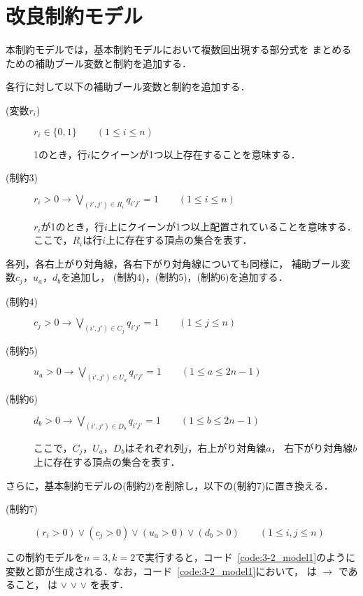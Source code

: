 \section{改良制約モデル}
本制約モデルでは，基本制約モデルにおいて複数回出現する部分式を
まとめるための補助ブール変数と制約を追加する．

各行に対して以下の補助ブール変数と制約を追加する．
\begin{description}
 \item[(変数$r_i$)] $r_{i} \in \{0,1\} \qquad (1 \leq i \leq n)$\par
  1のとき，行$i$にクイーンが1つ以上存在することを意味する．
 \item[(制約3)] $r_{i}>0 \rightarrow \bigvee\limits_{(i',j')\in R_{i}} q_{i'j'}=1 \qquad (1 \leq i \leq n)$ \par
  $r_{i}$が1のとき，行$i$上にクイーンが1つ以上配置されていることを意味する．
  ここで，$R_i$は行$i$上に存在する頂点の集合を表す．
\end{description}
%
各列，各右上がり対角線，各右下がり対角線についても同様に，
補助ブール変数$c_{j}$，$u_{a}$，$d_{b}$を追加し，
(制約4)，(制約5)，(制約6)を追加する．
%
\begin{description}
 \item[(制約4)] $c_{j}>0 \rightarrow \bigvee\limits_{(i',j')\in C_{j}} q_{i'j'}=1 \qquad (1 \leq j \leq n)$ 
 \item[(制約5)] $u_{a}>0 \rightarrow \bigvee\limits_{(i',j')\in U_{a}} q_{i'j'}=1 \qquad (1 \leq a \leq 2n-1)$ 
 \item[(制約6)] $d_{b}>0 \rightarrow \bigvee\limits_{(i',j')\in D_{b}} q_{i'j'}=1 \qquad (1 \leq b \leq 2n-1)$ \par
  ここで，$C_j$，$U_{a}$，$D_{b}$はそれぞれ列$j$，右上がり対角線$a$，
  右下がり対角線$b$上に存在する頂点の集合を表す．
\end{description}

さらに，基本制約モデルの(制約2)を削除し，以下の(制約7)に置き換える．
\begin{description}
 \item[(制約7)] $(r_i > 0) \vee (c_j >0) \vee (u_{a}>0) \vee (d_{b}>0) \qquad (1 \leq i,j \leq n)$
\end{description}

この制約モデルを$n=3,k=2$で実行すると，コード~\ref{code:3-2_model1}のように
変数と節が生成される．なお，コード~\ref{code:3-2_model1}において，
  
は $\rightarrow$ 
   
であること，  
 は $\vee$ 
 $\vee$  $\vee$ を表す．



